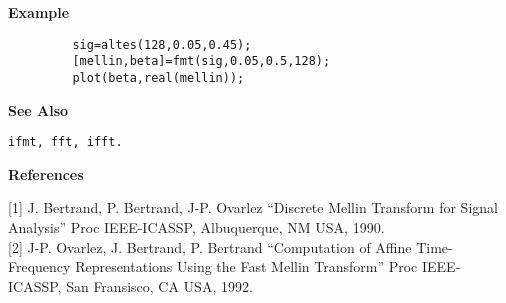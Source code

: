 {\bf \large {}\selectfont Example}
\begin{verbatim}
         sig=altes(128,0.05,0.45); 
         [mellin,beta]=fmt(sig,0.05,0.5,128);
         plot(beta,real(mellin));
\end{verbatim}
\vspace*{.5cm}


{\bf \large {}\selectfont See Also}\\
\hspace*{1.5cm}
\begin{minipage}[t]{13.5cm}
\begin{verbatim}
ifmt, fft, ifft.
\end{verbatim}
\end{minipage}
\vspace*{.5cm}


{\bf \large {}\selectfont References}\\
\hspace*{1.5cm}
\begin{minipage}[t]{13.5cm}
[1] J. Bertrand, P. Bertrand, J-P. Ovarlez ``Discrete Mellin Transform for
Signal Analysis'' Proc IEEE-ICASSP, Albuquerque, NM USA, 1990.\\

[2] J-P. Ovarlez, J. Bertrand, P. Bertrand ``Computation of Affine
Time-Frequency Representations Using the Fast Mellin Transform'' Proc
IEEE-ICASSP, San Fransisco, CA USA, 1992.
\end{minipage}


